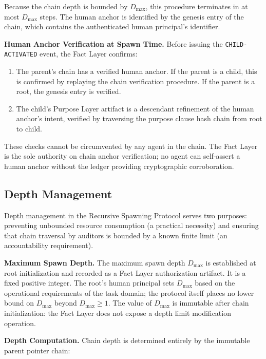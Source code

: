 Because the chain depth is bounded by $D_{\max}$, this procedure terminates in at most $D_{\max}$ steps. The human anchor is identified by the genesis entry of the chain, which contains the authenticated human principal's identifier.

\medskip
\noindent\textbf{Human Anchor Verification at Spawn Time.} Before issuing the \texttt{CHILD-ACTIVATED} event, the Fact Layer confirms:

\begin{enumerate}
  \item[(HAV-1)] The parent's chain has a verified human anchor. If the parent is a child, this is confirmed by replaying the chain verification procedure. If the parent is a root, the genesis entry is verified.
  \item[(HAV-2)] The child's Purpose Layer artifact is a descendant refinement of the human anchor's intent, verified by traversing the purpose clause hash chain from root to child.
\end{enumerate}

These checks cannot be circumvented by any agent in the chain. The Fact Layer is the sole authority on chain anchor verification; no agent can self-assert a human anchor without the ledger providing cryptographic corroboration.

\subsection{Depth Management}

Depth management in the Recursive Spawning Protocol serves two purposes: preventing unbounded resource consumption (a practical necessity) and ensuring that chain traversal by auditors is bounded by a known finite limit (an accountability requirement).

\medskip
\noindent\textbf{Maximum Spawn Depth.} The maximum spawn depth $D_{\max}$ is established at root initialization and recorded as a Fact Layer authorization artifact. It is a fixed positive integer. The root's human principal sets $D_{\max}$ based on the operational requirements of the task domain; the protocol itself places no lower bound on $D_{\max}$ beyond $D_{\max} \geq 1$. The value of $D_{\max}$ is immutable after chain initialization: the Fact Layer does not expose a depth limit modification operation.

\medskip
\noindent\textbf{Depth Computation.} Chain depth is determined entirely by the immutable parent pointer chain:

